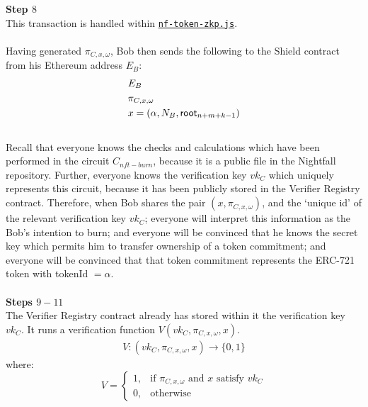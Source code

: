 \textbf{Step $8$}
\ \\
This transaction is handled within \hyperref[sec:nf-token-zkp]{\texttt{nf-token-zkp.js}}.\\
\\
Having generated $\pi_{C,x,\omega}$, Bob then sends the following to the Shield contract from his Ethereum address $E_B$:
\begin{align*}
  &E_B\\
  &\pi_{C,x,\omega}\\
  &x = (\alpha, N_{B}, \mathsf{root}_{n+m+k-1})
\end{align*}
\\
Recall that everyone knows the checks and calculations which have been performed in the circuit $C_{nft-burn}$, because it is a public file in the Nightfall repository. Further, everyone knows the verification key $vk_C$ which uniquely represents this circuit, because it has been publicly stored in the Verifier Registry contract. Therefore, when Bob shares the pair $(x, \pi_{C,x,\omega})$, and the `unique id' of the relevant verification key $vk_C$; everyone will interpret this information as the Bob's intention to burn; and everyone will be convinced that he knows the secret key which permits him to transfer ownership of a token commitment; and everyone will be convinced that that token commitment represents the ERC-721 token with tokenId $=\alpha$.\\
\\



\textbf{Steps $9 - 11$}
\ \\
The Verifier Registry contract already has stored within it the verification key $vk_C$.
It runs a verification function $V(vk_C, \pi_{C,x,\omega}, x)$.
\begin{align*}
  V: (vk_C, \pi_{C,x,\omega}, x) \to \{0,1\}
\end{align*}
where:
\[
    V=
\begin{cases}
    1,& \text{if } \pi_{C,x,\omega} \text{ and } x \text{ satisfy } vk_C\\
    0,& \text{otherwise}
\end{cases}
\]
\ \\



